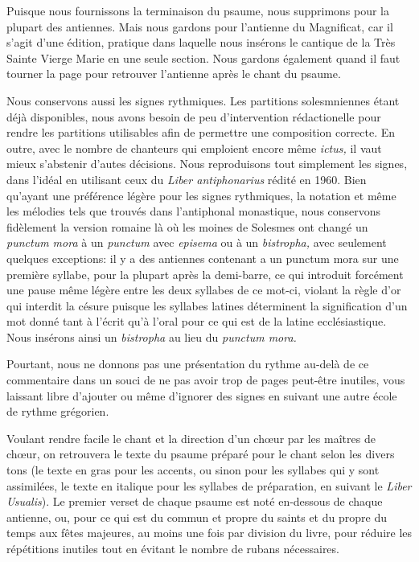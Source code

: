 \begin{frpars}
Puisque nous fournissons la terminaison du psaume, nous supprimons  pour la plupart des antiennes. Mais nous gardons  pour l'antienne du Magnificat, car il s'agit d'une édition, pratique dans laquelle nous insérons le cantique de la Très Sainte Vierge Marie en une seule section. Nous gardons également  quand il faut tourner la page pour retrouver l'antienne après le chant du psaume.


Nous conservons aussi les signes rythmiques. Les partitions solesmniennes étant déjà disponibles, nous avons besoin de peu d'intervention rédactionelle pour rendre les partitions utilisables afin de permettre une composition correcte. En outre, avec le nombre de chanteurs qui emploient encore même \textit{ictus,} il vaut mieux s'abstenir d'autes décisions. Nous reproduisons tout simplement les signes, dans l'idéal en utilisant ceux du \textit{Liber antiphonarius} rédité en 1960. Bien qu'ayant une préférence légère pour les signes rythmiques, la notation et même les mélodies tels que trouvés dans l'antiphonal monastique, nous conservons fidèlement la version romaine là où les moines de Solesmes ont changé un \textit{punctum mora} à un \textit{punctum} avec \textit{episema} ou à un \textit{bistropha,} avec seulement quelques exceptions: il y a des antiennes contenant a un punctum mora sur une première syllabe, pour la plupart après la demi-barre, ce qui introduit forcément une pause même légère entre les deux syllabes de ce mot-ci, violant la règle d'or qui interdit la césure puisque les syllabes latines déterminent la signification d'un mot donné tant à l'écrit qu'à l'oral pour ce qui est de la latine ecclésiastique. Nous insérons ainsi un \textit{bistropha} au lieu du \textit{punctum mora.}

Pourtant, nous ne donnons pas une présentation du rythme au-delà de ce commentaire dans un souci de ne pas avoir trop de pages peut-être inutiles, vous laissant libre d'ajouter ou même d'ignorer des signes en suivant une autre école de rythme grégorien.

Voulant rendre facile le chant et la direction d'un chœur par les maîtres de chœur, on retrouvera le texte du psaume préparé pour le chant selon les divers tons (le texte en gras pour les accents, ou sinon pour les syllabes qui y sont assimilées, le texte en italique pour les syllabes de préparation, en suivant le \textit{Liber Usualis}). Le premier verset de chaque psaume est noté en-dessous de chaque antienne, ou, pour ce qui est du commun et propre du saints et du propre du temps aux fêtes majeures, au moins une fois par division du livre, pour réduire les répétitions inutiles tout en évitant le nombre de rubans nécessaires.


\end{frpars}
